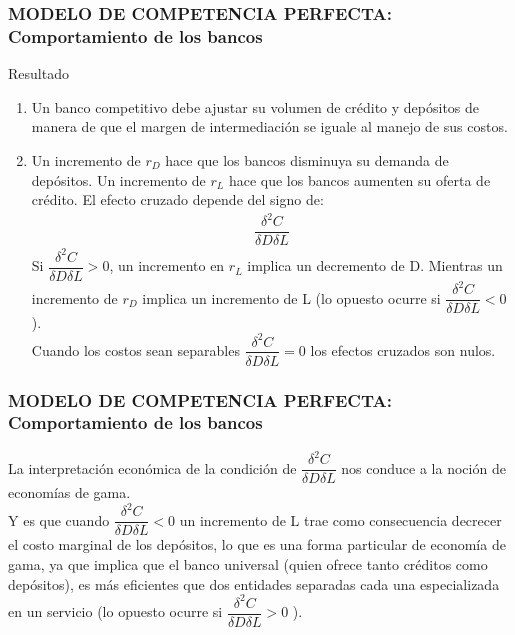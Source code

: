 \begin{frame}
    \frametitle{{\normalsize MODELO DE COMPETENCIA PERFECTA: Comportamiento de los bancos} {}}
    {\footnotesize \begin{block} {Resultado}
        \begin{enumerate}
            \item Un banco competitivo debe ajustar su volumen de crédito y depósitos de manera de que el margen de intermediación se iguale al manejo de sus costos.
            \item Un incremento de $r_{D}$ hace que los bancos disminuya su demanda de depósitos. Un incremento de $r_{L}$ hace que los bancos aumenten su oferta de crédito. El efecto cruzado depende del signo de:
          \begin{align}
          \dfrac{\delta^{2}C}{\delta D \delta L} \nonumber
          \end{align} 
          Si $\dfrac{\delta^{2}C}{\delta D \delta L}>0 $, un incremento en $r_{L}$ implica un decremento de D. Mientras un incremento de  $r_{D}$ implica un incremento de L (lo opuesto ocurre si $\dfrac{\delta^{2}C}{\delta D \delta L}<0 $ ).\\
           Cuando los costos sean separables $\dfrac{\delta^{2}C}{\delta D \delta L}=0 $ los efectos cruzados son nulos.   
        \end{enumerate}     
        
    \end{block}	 }


\end{frame}



\begin{frame}
    \frametitle{{\normalsize MODELO DE COMPETENCIA PERFECTA: Comportamiento de los bancos} {}}
    La interpretación económica de la condición de $\dfrac{\delta^{2}C}{\delta D \delta L}$ nos conduce a la noción de economías de gama. \\
    Y es que cuando $\dfrac{\delta^{2}C}{\delta D \delta L}<0$ un incremento de L trae como consecuencia decrecer el costo marginal de los depósitos, lo que es una forma particular de economía de gama, ya que implica que el banco universal (quien ofrece tanto créditos como depósitos), es más eficientes que dos entidades separadas cada una especializada en un servicio (lo opuesto ocurre si $\dfrac{\delta^{2}C}{\delta D \delta L}>0 $ ).
\end{frame}

